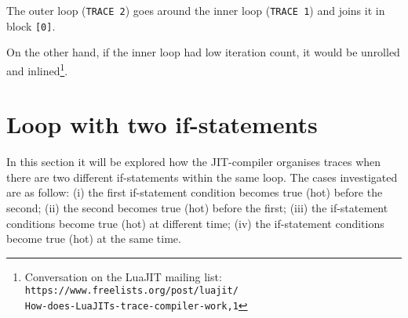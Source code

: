 \begin{comment}
TRACE 1 contains the instruction of the inner loop. At line 0001 SLOAD (store a value) is used to init the register used by the loop. Lines 0002-0008 take the reference and load \textit{x}. Lines 0009-0012 contain the loop unrolled and lines 0014-0017 the actual loop. The value of x is incremented by 1 (ADD) and the result is stored (HSTORE), then the loop is incremented (ADD) and  it is checked the loop termination (LE). Then, in line 0010 it is executed $x=x+1$ and the result is stored (line 0011). Finally the loop is incremented (line 0012) and it is checked the loop termination (line 0013). The last line 0014 converts the number in integer.

In TRACE 2 it is shown the instruction related to the outer loop. In this case is computed the operation $x=x*3$ (line 0011). The other lines show instruction previously described.\\

\end{comment}
\noindent
The outer loop (\texttt{TRACE 2}) goes around the inner loop (\texttt{TRACE 1}) and joins it in block \texttt{[0]}.

On the other hand, if the inner loop had low iteration count, it would be unrolled and inlined\footnote{Conversation on the LuaJIT mailing list: 
\texttt{https://www.freelists.org/post/luajit/\\How-does-LuaJITs-trace-compiler-work,1}}.

\newpage

\section{Loop with two if-statements}
\label{section:2-if-statements}

In this section it will be explored how the JIT-compiler organises traces when there are two different if-statements within the same loop. The cases investigated are as follow: (i) the first if-statement condition becomes true (hot) before the second; (ii) the second becomes true (hot) before the first; (iii) the if-statement conditions become true (hot) at different time; (iv) the if-statement conditions become true (hot) at the same time.

